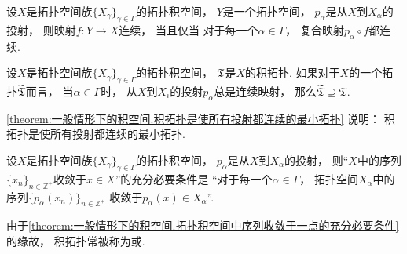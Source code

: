 \begin{theorem}\label{theorem:一般情形下的积空间.投射与映射的复合的连续性}
设\(X\)是拓扑空间族\(\{X_\gamma\}_{\gamma \in \Gamma}\)的拓扑积空间，
\(Y\)是一个拓扑空间，
\(p_\alpha\)是从\(X\)到\(X_\alpha\)的投射，
则映射\(f\colon Y \to X\)连续，
当且仅当
对于每一个\(\alpha \in \Gamma\)，
复合映射\(p_\alpha \circ f\)都连续.
\end{theorem}

\begin{theorem}\label{theorem:一般情形下的积空间.积拓扑是使所有投射都连续的最小拓扑}
设\(X\)是拓扑空间族\(\{X_\gamma\}_{\gamma \in \Gamma}\)的拓扑积空间，
\({\mathfrak T}\)是\(X\)的积拓扑.
如果对于\(X\)的一个拓扑\(\widetilde{{\mathfrak T}}\)而言，
当\(\alpha \in \Gamma\)时，
从\(X\)到\(X_i\)的投射\(p_\alpha\)总是连续映射，
那么\(\widetilde{{\mathfrak T}} \supseteq {\mathfrak T}\).
\end{theorem}
\begin{remark}
\cref{theorem:一般情形下的积空间.积拓扑是使所有投射都连续的最小拓扑} 说明：
积拓扑是使所有投射都连续的最小拓扑.
\end{remark}

\begin{theorem}\label{theorem:一般情形下的积空间.拓扑积空间中序列收敛于一点的充分必要条件}
设\(X\)是拓扑空间族\(\{X_\gamma\}_{\gamma \in \Gamma}\)的拓扑积空间，
\(p_\alpha\)是从\(X\)到\(X_\alpha\)的投射，
则“\(X\)中的序列\(\{x_n\}_{n\in\mathbb{Z}^+}\)收敛于\(x \in X\)”的充分必要条件是
“对于每一个\(\alpha \in \Gamma\)，
拓扑空间\(X_\alpha\)中的序列\(\{p_\alpha(x_n)\}_{n\in\mathbb{Z}^+}\)
收敛于\(p_\alpha(x) \in X_\alpha\)”.
\end{theorem}
由于\cref{theorem:一般情形下的积空间.拓扑积空间中序列收敛于一点的充分必要条件} 的缘故，
积拓扑常被称为或.
